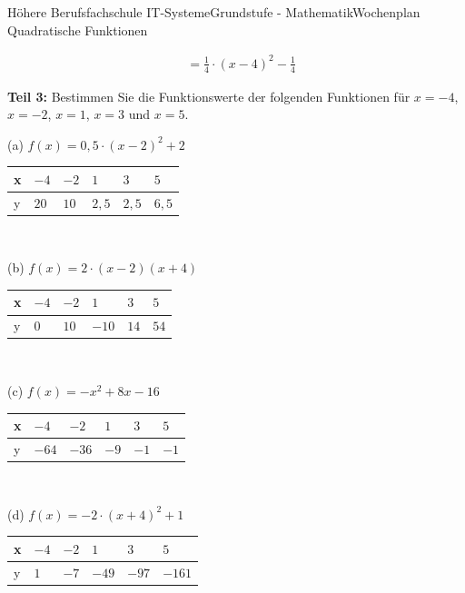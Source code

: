 \documentclass[oneside,openany,headings=optiontotoc,11pt,numbers=noenddot]{scrreprt}
\begin{document}
\begin{worksheet}{Höhere Berufsfachschule IT-Systeme}{Grundstufe - Mathematik}{Wochenplan Quadratische Funktionen}
\begin{framed}
\begin{align*}
				& = \frac{1}{4}\cdot{}(x-4)^2 - \frac{1}{4}
			\end{align*}
		\end{framed}
		\begin{framed}
			\noindent
			\textbf{Teil 3:} Bestimmen Sie die Funktionswerte der folgenden Funktionen für \(x = -4\), \(x = -2\), \(x = 1\), \(x = 3\) und \(x = 5\).\\
			\par\noindent
			(a) \(f(x) = 0,5\cdot(x-2)^2 + 2\)\\
			\par\noindent
			\begin{tabularx}{\textwidth}{X|X|X|X|X|X}
				x & \(-4\) & \(-2\) & \(1\) & \(3\) & \(5\)\\
				\hline
				y & \(20\) & \(10\) & \(2,5\) & \(2,5\) & \(6,5\)\\
			\end{tabularx}\\
			\par\noindent
			(b) \(f(x) = 2\cdot(x-2)(x+4)\)\\
			\par\noindent
			\begin{tabularx}{\textwidth}{X|X|X|X|X|X}
				x & \(-4\) & \(-2\) & \(1\) & \(3\) & \(5\)\\
				\hline
				y & \(0\) & \(10\) & \(-10\) & \(14\) & \(54\)\\
			\end{tabularx}\\
			\par\noindent
			(c) \(f(x) = -x^2 + 8x -16\)\\
			\par\noindent
			\begin{tabularx}{\textwidth}{X|X|X|X|X|X}
				x & \(-4\) & \(-2\) & \(1\) & \(3\) & \(5\)\\
				\hline
				y & \(-64\) & \(-36\) & \(-9\) & \(-1\) & \(-1\)\\
			\end{tabularx}\\
			\par\noindent
			(d) \(f(x) = -2\cdot(x+4)^2 + 1\)\\
			\par\noindent
			\begin{tabularx}{\textwidth}{X|X|X|X|X|X}
				x & \(-4\) & \(-2\) & \(1\) & \(3\) & \(5\)\\
				\hline
				y & \(1\) & \(-7\) & \(-49\) & \(-97\) & \(-161\)\\

\end{tabularx}
\end{framed}
\end{worksheet}
\end{document}
